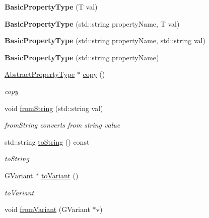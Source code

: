 \begin{DoxyCompactItemize}
\item 
\hypertarget{classBasicPropertyType_a0fcc2038187aad4b1ee6223daaff65d6}{{\bfseries Basic\+Property\+Type} (T val)}\label{classBasicPropertyType_a0fcc2038187aad4b1ee6223daaff65d6}

\item 
\hypertarget{classBasicPropertyType_a5336941eaf15eefbfc9f84554619b72d}{{\bfseries Basic\+Property\+Type} (std\+::string property\+Name, T val)}\label{classBasicPropertyType_a5336941eaf15eefbfc9f84554619b72d}

\item 
\hypertarget{classBasicPropertyType_a1bb538ecec45a113bbfc1fa23eabfde1}{{\bfseries Basic\+Property\+Type} (std\+::string property\+Name, std\+::string val)}\label{classBasicPropertyType_a1bb538ecec45a113bbfc1fa23eabfde1}

\item 
\hypertarget{classBasicPropertyType_a4f8b38f1e145d5ee7387a58faaef8e60}{{\bfseries Basic\+Property\+Type} (std\+::string property\+Name)}\label{classBasicPropertyType_a4f8b38f1e145d5ee7387a58faaef8e60}

\item 
\hyperlink{classAbstractPropertyType}{Abstract\+Property\+Type} $\ast$ \hyperlink{classBasicPropertyType_a244d19253bfc42dfadd84570b8c8e404}{copy} ()
\begin{DoxyCompactList}\small\item\em copy \end{DoxyCompactList}\item 
\hypertarget{classBasicPropertyType_a3c73a6a2c2c020ec327849f318ae9f2a}{void \hyperlink{classBasicPropertyType_a3c73a6a2c2c020ec327849f318ae9f2a}{from\+String} (std\+::string val)}\label{classBasicPropertyType_a3c73a6a2c2c020ec327849f318ae9f2a}

\begin{DoxyCompactList}\small\item\em from\+String converts from string value \end{DoxyCompactList}\item 
std\+::string \hyperlink{classBasicPropertyType_a672e2824bcc38da6e60090022fd8d114}{to\+String} () const 
\begin{DoxyCompactList}\small\item\em to\+String \end{DoxyCompactList}\item 
G\+Variant $\ast$ \hyperlink{classBasicPropertyType_a893a2d1f8fec7141159d850caa78bc06}{to\+Variant} ()
\begin{DoxyCompactList}\small\item\em to\+Variant \end{DoxyCompactList}\item 
\hypertarget{classBasicPropertyType_a0e1213ee2df11ecd556b250fe3bad21b}{void \hyperlink{classBasicPropertyType_a0e1213ee2df11ecd556b250fe3bad21b}{from\+Variant} (G\+Variant $\ast$v)}\label{classBasicPropertyType_a0e1213ee2df11ecd556b250fe3bad21b}


\end{DoxyCompactItemize}
